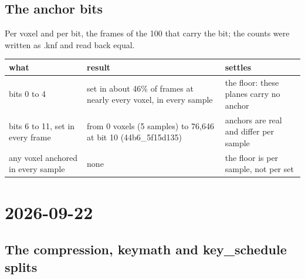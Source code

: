 \subsection{\texorpdfstring{The anchor bits}{The anchor bits}}

Per voxel and per bit, the frames of the 100 that carry the bit; the counts were written as .knf and read back equal.

{\small
\setlength{\tabcolsep}{6pt}
\begin{longtable}{>{\RaggedRight\arraybackslash}p{}>{\RaggedRight\arraybackslash}p{}>{\RaggedRight\arraybackslash}p{}}
\toprule
what & result & settles \\
\midrule
\endhead
bits 0 to 4 & set in about 46\% of frames at nearly every voxel, in every sample & the floor: these planes carry no anchor \\
bits 6 to 11, set in every frame & from 0 voxels (5 samples) to 76,646 at bit 10 (44b6\_\allowbreak{}5f15d135) & anchors are real and differ per sample \\
any voxel anchored in every sample & none & the floor is per sample, not per set \\
\bottomrule
\end{longtable}
}

\section{\texorpdfstring{2026-09-22}{2026-09-22}}

\subsection{\texorpdfstring{The compression, keymath and key\_\allowbreak{}schedule splits}{The compression, keymath and key\_schedule splits}}

